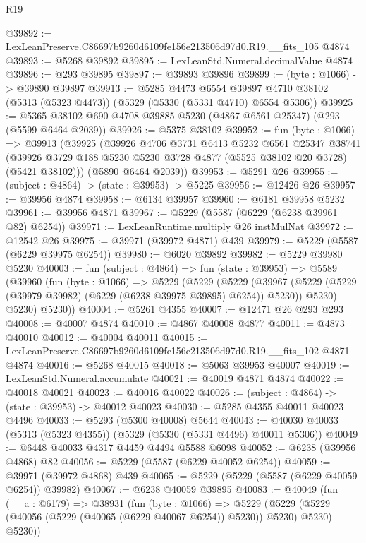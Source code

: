 \begin{lexlean}{R19}
\begin{coremodule}
@39892 := LexLeanPreserve.C86697b9260d6109fe156e213506d97d0.R19.__fits_105 @4874
@39893 := @5268 @39892
@39895 := LexLeanStd.Numeral.decimalValue @4874
@39896 := @293 @39895
@39897 := @39893 @39896
@39899 := (byte : @1066) -> @39890 @39897
@39913 := @5285
    @4473
    @6554
    @39897
    @4710
    @38102
    (@5313 (@5323 @4473))
    (@5329 (@5330 (@5331 @4710) @6554 @5306))
@39925 := @5365 @38102 @690 @4708 @39885 @5230 (@4867 @6561 @25347) (@293 (@5599 @6464 @2039))
@39926 := @5375 @38102
@39952 := fun (byte : @1066) =>
  @39913
    (@39925
      (@39926
        @4706
        @3731
        @6413
        @5232
        @6561
        @25347
        @38741
        (@39926 @3729 @188 @5230 @5230 @3728 @4877 (@5525 @38102 @20 @3728) (@5421 @38102)))
      (@5890 @6464 @2039))
@39953 := @5291 @26
@39955 := (subject : @4864) -> (state : @39953) -> @5225
@39956 := @12426 @26
@39957 := @39956 @4874
@39958 := @6134 @39957
@39960 := @6181 @39958 @5232
@39961 := @39956 @4871
@39967 := @5229 (@5587 (@6229 (@6238 @39961 @82) @6254))
@39971 := LexLeanRuntime.multiply @26 instMulNat
@39972 := @12542 @26
@39975 := @39971 (@39972 @4871) @439
@39979 := @5229 (@5587 (@6229 @39975 @6254))
@39980 := @6020 @39892
@39982 := @5229 @39980 @5230
@40003 := fun (subject : @4864) =>
  fun (state : @39953) =>
  @5589
    (@39960
      (fun (byte : @1066) =>
      @5229
        (@5229
          (@5229
            (@39967 (@5229 (@5229 (@39979 @39982) (@6229 (@6238 @39975 @39895) @6254)) @5230))
            @5230)
          @5230)
        @5230))
@40004 := @5261 @4355
@40007 := @12471 @26 @293 @293
@40008 := @40007 @4874
@40010 := @4867 @40008 @4877
@40011 := @4873 @40010
@40012 := @40004 @40011
@40015 := LexLeanPreserve.C86697b9260d6109fe156e213506d97d0.R19.__fits_102 @4871 @4874
@40016 := @5268 @40015
@40018 := @5063 @39953 @40007
@40019 := LexLeanStd.Numeral.accumulate
@40021 := @40019 @4871 @4874
@40022 := @40018 @40021
@40023 := @40016 @40022
@40026 := (subject : @4864) -> (state : @39953) -> @40012 @40023
@40030 := @5285 @4355 @40011 @40023 @4496
@40033 := @5293 (@5300 @40008) @5644
@40043 := @40030 @40033 (@5313 (@5323 @4355)) (@5329 (@5330 (@5331 @4496) @40011 @5306))
@40049 := @6448 @40033 @4317 @4459 @4494 @5588 @6098
@40052 := @6238 (@39956 @4868) @82
@40056 := @5229 (@5587 (@6229 @40052 @6254))
@40059 := @39971 (@39972 @4868) @439
@40065 := @5229 (@5229 (@5587 (@6229 @40059 @6254)) @39982)
@40067 := @6238 @40059 @39895
@40083 := @40049
    (fun (__a : @6179) =>
    @38931
      (fun (byte : @1066) =>
      @5229 (@5229 (@5229 (@40056 (@5229 (@40065 (@6229 @40067 @6254)) @5230)) @5230) @5230) @5230))

\end{coremodule}
\end{lexlean}
